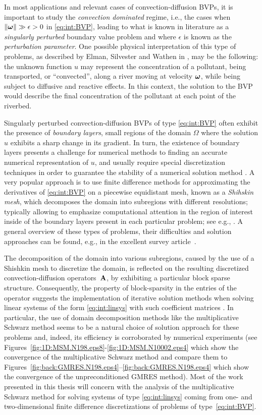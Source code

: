 In most applications and relevant cases of convection-diffusion BVPs, it
is important to study the \textit{convection dominated} regime, i.e., the cases
when $\|\bm{\omega}\|\gg \epsilon >0$ in \eqref{eq:int:BVP}, leading to what is known in
literature as a \textit{singularly perturbed} boundary value problem and where
$\epsilon$ is known as the \textit{perturbation parameter}.
One possible physical interpretation of this type of problems, as described by Elman, Silvester and Wathen in \cite{ElmSilWat14}, may be the
following: the unknown function $u$ may represent the concentration of a
pollutant, being transported, or ``convected'', along a river moving at velocity
$\bm{\omega}$, while being subject to diffusive and reactive effects. In this context,
the solution to the BVP would describe the final concentration of the pollutant
at each point of the riverbed.

Singularly perturbed convection-diffusion BVPs of type \eqref{eq:int:BVP} often
exhibit the presence of \textit{boundary layers}, small regions of the domain
$\Omega$ where the solution $u$ exhibits a sharp change in its gradient. In
turn, the existence of boundary layers presents a challenge for numerical
methods to finding an accurate numerical representation of $u$, and usually
require special discretization techniques in order to guarantee the stability
of a numerical solution method \cite{Mor96}. A very popular approach is to use finite
difference methods for approximating the derivatives of \eqref{eq:int:BVP} on a
piecewise equidistant mesh, known as a \textit{Shihskin mesh}, which
decomposes the domain into subregions with different resolutions; typically
allowing to emphasize computational attention in the region of interest inside
of the boundary layers present in each particular problem; see e.g., \cite{Sty13}. A general overview
of these types of problems, their difficulties and solution approaches can be
found, e.g., in the excellent survey article~\cite{Sty05}.

The decomposition of the domain into various subregions, caused by the use of a
Shishkin mesh to discretize the domain, is reflected on the resulting
discretized convection-diffusion operators~$\mathbf{A}$, by exhibiting a particular
block sparse structure. Consequently, the property of block-sparsity in the
entries of the operator suggests the implementation of iterative solution
methods when solving linear systems of the form \eqref{eq:int:linsys} with such
coefficient matrices \cite{Saa03}. In particular, the use of domain decomposition methods
like the multiplicative Schwarz method seems to be a natural choice of solution
approach for these problems and, indeed, its efficiency is corroborated by
numerical experiments (see Figures~\ref{fig:1D:MSM.N198.eps8}-\ref{fig:1D:MSM.N10002.eps4} which show the convergence of the multiplicative
Schwarz method and compare them to Figures~\ref{fig:back:GMRES.N198.eps4}--\ref{fig:back:GMRES.N198.eps4} which show the convergence of the
unpreconditioned GMRES method). Most of the work presented in this thesis will
concern with the analysis of the multiplicative Schwarz method for solving
systems of type \eqref{eq:int:linsys} coming from one- and two-dimensional
finite difference discretizations of problems of type~\eqref{eq:int:BVP}.

